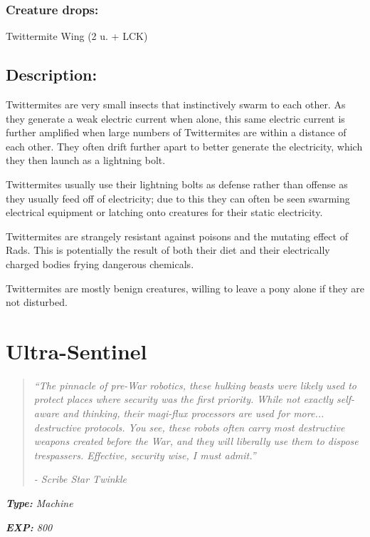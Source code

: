 \documentclass[11pt,a4paper,twocolumn]{book}
\begin{document}
	\subsubsection*{Creature drops:}
	Twittermite Wing (2 u. + LCK)
	
	\subsection*{Description:}
	Twittermites are very small insects that instinctively swarm to each other. As they generate a weak electric current when alone, this same electric current is further amplified when large numbers of Twittermites are within a distance of each other. They often drift further apart to better generate the electricity, which they then launch as a lightning bolt.
	
	Twittermites usually use their lightning bolts as defense rather than offense as they usually feed off of electricity; due to this they can often be seen swarming electrical equipment or latching onto creatures for their static electricity.
	
	Twittermites are strangely resistant against poisons and the mutating effect of Rads. This is potentially the result of both their diet and their electrically charged bodies frying dangerous chemicals.
	
	Twittermites are mostly benign creatures, willing to leave a pony alone if they are not disturbed.
	
	\clearpage
	
	\section*{Ultra-Sentinel}
	\begin{quote}
		\emph{``The pinnacle of pre-War robotics, these hulking beasts were likely used to protect places where security was the first priority. While not exactly self-aware and thinking, their magi-flux processors are used for more... destructive protocols. You see, these robots often carry most destructive weapons created before the War, and they will liberally use them to dispose trespassers. Effective, security wise, I must admit.''}
		
		\emph{-	Scribe Star Twinkle}
	\end{quote}
	
	\emph{\textbf{Type:} Machine}
	
	\emph{\textbf{EXP:} 800}
	
\end{document}
